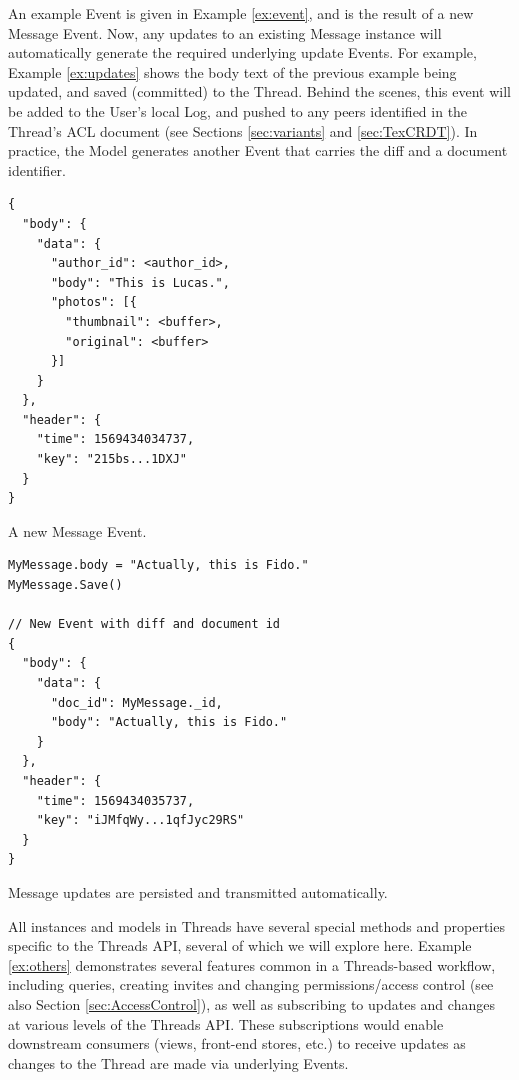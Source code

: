 \documentclass{textile}
\begin{document}
An example Event is given in Example \ref{ex:event}, and is the result of a new Message Event. Now, any updates to an existing Message instance will automatically generate the required underlying update Events. For example, Example \ref{ex:updates} shows the body text of the previous example being updated, and saved (committed) to the Thread. Behind the scenes, this event will be added to the User's local Log, and pushed to any peers identified in the Thread's ACL document (see Sections \ref{sec:variants} and \ref{sec:TexCRDT}). In practice, the Model generates another Event that carries the diff and a document identifier.

\begin{example}
  \begin{minipage}{.45\textwidth}
    \begin{lstlisting}
{
  "body": {
    "data": {
      "author_id": <author_id>,
      "body": "This is Lucas.",
      "photos": [{
        "thumbnail": <buffer>,
        "original": <buffer>
      }]
    }
  },
  "header": {
    "time": 1569434034737,
    "key": "215bs...1DXJ"
  }
}
    \end{lstlisting}
  \end{minipage}
\caption{A new Message Event.}
\label{ex:event}
\end{example}

\begin{example}
  \begin{minipage}{.45\textwidth}
    \begin{lstlisting}
MyMessage.body = "Actually, this is Fido."
MyMessage.Save()

// New Event with diff and document id
{
  "body": {
    "data": {
      "doc_id": MyMessage._id,
      "body": "Actually, this is Fido."
    }
  },
  "header": {
    "time": 1569434035737,
    "key": "iJMfqWy...1qfJyc29RS"
  }
}
    \end{lstlisting}
  \end{minipage}
\caption{Message updates are persisted and transmitted automatically.}
\label{ex:updates}
\end{example}

All instances and models in Threads have several special methods and properties specific to the Threads API, several of which we will explore here. Example \ref{ex:others} demonstrates several features common in a Threads-based workflow, including queries, creating invites and changing permissions/access control (see also Section \ref{sec:AccessControl}), as well as subscribing to updates and changes at various levels of the Threads API. These subscriptions would enable downstream consumers (views, front-end stores, etc.) to receive updates as changes to the Thread are made via underlying Events.
\end{document}
